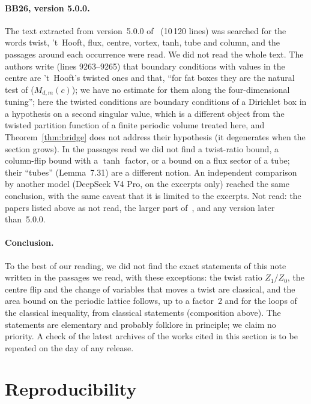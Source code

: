 \documentclass[11pt,a4paper]{article}
\theoremstyle{plain}
\theoremstyle{definition}
\theoremstyle{remark}
\numberwithin{equation}{section}
\begin{document}
\paragraph{BB26, version 5.0.0.} The text extracted from version~5.0.0 of~\cite{BB26} (10\,120 lines) was searched for the words twist, 't~Hooft, flux, centre, vortex, tanh, tube and column, and the passages around each occurrence were read. We did not read the whole text. The authors write (lines 9263--9265) that boundary conditions with values in the centre are 't~Hooft's twisted ones and that, ``for fat boxes they are the natural test of ($M_{d,m}(c)$); we have no estimate for them along the four-dimensional tuning''; here the twisted conditions are boundary conditions of a Dirichlet box in a hypothesis on a second singular value, which is a different object from the twisted partition function of a finite periodic volume treated here, and Theorem~\ref{thm:bridge} does not address their hypothesis (it degenerates when the section grows). In the passages read we did not find a twist-ratio bound, a column-flip bound with a $\tanh$ factor, or a bound on a flux sector of a tube; their ``tubes'' (Lemma~7.31) are a different notion. An independent comparison by another model (DeepSeek V4 Pro, on the excerpts only) reached the same conclusion, with the same caveat that it is limited to the excerpts. Not read: the papers listed above as not read, the larger part of~\cite{BB26}, and any version later than~5.0.0.

\paragraph{Conclusion.} To the best of our reading, we did not find the exact statements of this note written in the passages we read, with these exceptions: the twist ratio $Z_1/Z_0$, the centre flip and the change of variables that moves a twist are classical, and the area bound on the periodic lattice follows, up to a factor~2 and for the loops of the classical inequality, from classical statements (composition above). The statements are elementary and probably folklore in principle; we claim no priority. A check of the latest archives of the works cited in this section is to be repeated on the day of any release.

\section{Reproducibility}\label{sec:repro}
\end{document}
